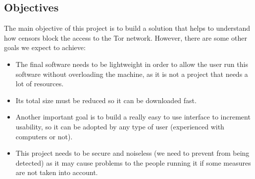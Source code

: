 \subsection{Objectives}
The main objective of this project is to build a solution that helps to understand how censors block the access to the Tor network. However, there are some other goals we expect to achieve: 
\begin{itemize}
\item The final software needs to be lightweight in order to allow the user run this software without overloading the machine, as it is not a project that needs a lot of resources.
\item Its total size must be reduced so it can be downloaded fast.
\item Another important goal is to build a really easy to use interface to increment usability, so it can be adopted by any type of user (experienced with computers or not).
\item This project needs to be secure and noiseless (we need to prevent from being detected) as it may cause problems to the people running it if some measures are not taken into account.
\end{itemize}

